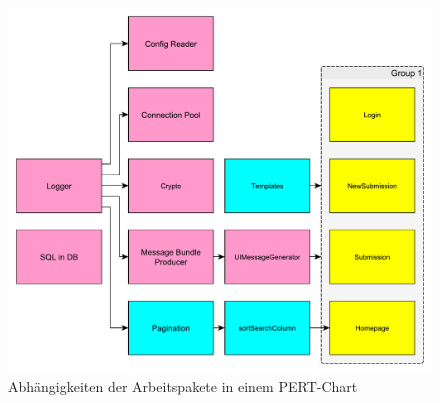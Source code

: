
\begin{figure}
    \includegraphics[width=\textwidth]{graphics/pert}
    \caption{Abhängigkeiten der Arbeitspakete in einem PERT-Chart}
    \label{fig:pert}
\end{figure}